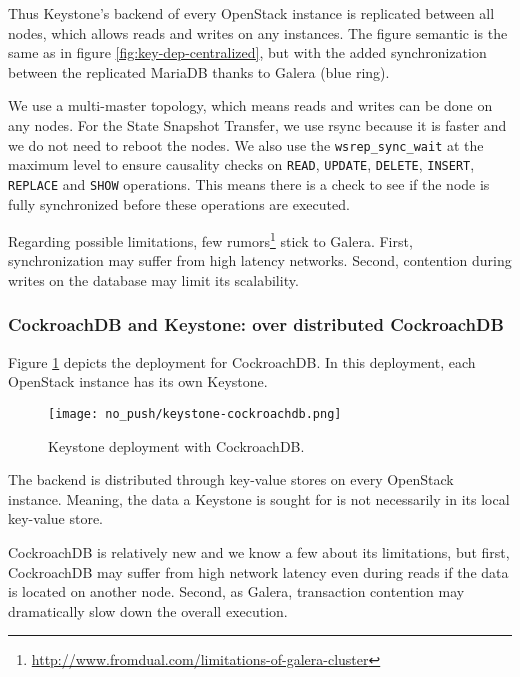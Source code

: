  Thus Keystone’s backend of every OpenStack instance is replicated between all nodes, which allows reads and writes on any instances. The figure semantic is the same as in figure \ref{fig:key-dep-centralized}, but with the added synchronization between the replicated MariaDB thanks to Galera (blue ring).

We use a multi-master topology, which means reads and writes can be done on any nodes. For the State Snapshot Transfer, we use rsync because it is faster and we do not need to reboot the nodes. We also use the \verb+wsrep_sync_wait+ at the maximum level to ensure causality checks on \verb+READ+, \verb+UPDATE+, \verb+DELETE+, \verb+INSERT+, \verb+REPLACE+ and \verb+SHOW+ operations. This means there is a check to see if the node is fully synchronized before these operations are executed.

Regarding possible limitations, few rumors\footnote{\url{http://www.fromdual.com/limitations-of-galera-cluster}} stick to Galera. First, synchronization may suffer from high latency networks. Second, contention during writes on the database may limit its scalability.



\subsubsection{CockroachDB and Keystone: over distributed CockroachDB}
Figure \ref{fig:key-dep-crdb} depicts the deployment for CockroachDB. In this deployment, each OpenStack instance has its own Keystone.

\begin{figure}
  \vspace{-20pt}
  \begin{center}
    \texttt{[image: no\_push/keystone-cockroachdb.png]}
  \end{center}
  \vspace{-20pt}
  \caption{Keystone deployment with CockroachDB.}
  \vspace{-12pt}
  \label{fig:key-dep-crdb}
\end{figure}

The backend is distributed through key-value stores on every OpenStack instance. Meaning, the data a Keystone is sought for is not necessarily in its local key-value store.

CockroachDB is relatively new and we know a few about its limitations, but first, CockroachDB may suffer from high network latency even during reads if the data is located on another node. Second, as Galera, transaction contention may dramatically slow down the overall execution.

